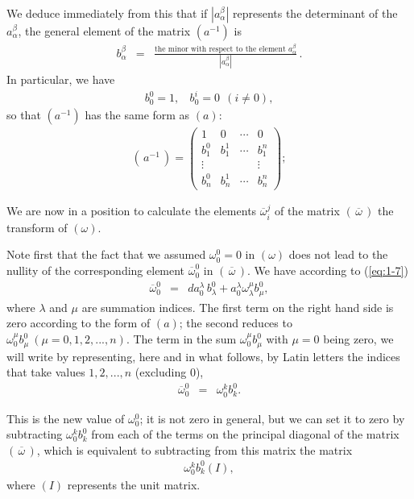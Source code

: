 We deduce immediately from this that if $|a^\beta_\alpha |$ represents the determinant of the $a^\beta_\alpha$, the general element of the matrix $(a^{-1})$ is 
\begin{eqnarray*}
b^\beta_\alpha &=& \frac{\mbox{the minor with respect to the element } a^\beta_\alpha}{|a^\beta_\alpha |}\, .
\end{eqnarray*}
In particular, we have
\begin{eqnarray*}
b^0_0 = 1, \ \ \ \ b^i_0 = 0 \ \ (i\neq 0),
\end{eqnarray*}
so that $(a^{-1})$ has the same form as $(a)$:
\begin{eqnarray*}
(\, a^{-1} \,) = \left(
\begin{array}{cccc}
1 &  0  & \cdots & 0 \\
b^0_1 &  b^1_1  & \cdots & b^n_1 \\
\vdots &    &  & \vdots \\
b^0_n &  b^1_n  & \cdots & b^n_n 
\end{array}
\right); 
\end{eqnarray*}

We are now in a position to calculate the elements $\overline \omega^j_i$ of the matrix $(\, \overline \omega\, )$ the transform of $(\omega)$.

Note first that the fact that we assumed $\omega^0_0 = 0$ in $(\omega)$ does not lead to the nullity of the corresponding element $\overline \omega^0_0$ in $(\, \overline \omega\, )$. We have according to (\ref{eq:1-7})
\begin{eqnarray*}
\overline \omega^0_0 &=& da^\lambda_0 \, b^0_\lambda + a^\lambda_0 \omega^\mu_\lambda b^0_\mu ,
\end{eqnarray*}
where $\lambda$ and $\mu$ are summation indices. The first term on the right hand side is zero according to the form of $(a)$; the second reduces to $\omega^\mu_0 b^0_\mu \ (\mu = 0,1,2,...,n)$. The term in the sum $\omega^\mu_0 b^0_\mu$ with $\mu=0$ being zero, we will write by representing, here and in what follows, by Latin letters the indices that take values $1,2,...,n$ (excluding 0), 
\begin{eqnarray*}
\overline \omega^0_0 &=&   \omega^k_0 b^0_k .
\end{eqnarray*}

This is the new value of $\omega^0_0$; it is not zero in general, but we can set it to zero by subtracting $\omega^k_0 b^0_k$ from each of the terms on the principal diagonal of the matrix $(\, \overline \omega\, )$, which is equivalent to subtracting from this matrix the matrix
\begin{eqnarray*}
\omega^k_0 b^0_k (I),
\end{eqnarray*}
where $(I)$ represents the unit matrix.

